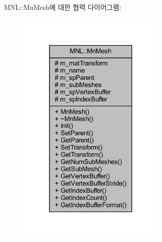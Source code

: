 M\+NL\+:\+:Mn\+Mesh에 대한 협력 다이어그램\+:\nopagebreak
\begin{figure}[H]
\begin{center}
\leavevmode
\includegraphics[width=206pt]{class_m_n_l_1_1_mn_mesh__coll__graph}
\end{center}
\end{figure}
